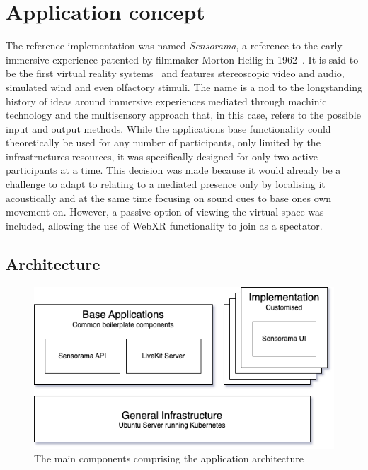 \chapter{Application concept}
\label{ch:concept}

The reference implementation was named \emph{Sensorama}, a reference to the early immersive experience patented by filmmaker Morton Heilig in 1962~\parencite{Heilig_1962}.
It is said to be the first virtual reality systems~\parencite[5][]{vrHistoryGigante} and features stereoscopic video and audio, simulated wind and even olfactory stimuli.
The name is a nod to the longstanding history of ideas around immersive experiences mediated through machinic technology and the multisensory approach that, in this case, refers to the possible input and output methods.
While the application\textquotesingle s base functionality could theoretically be used for any number of participants, only limited by the infrastructure\textquotesingle s resources, it was specifically designed for only two active participants at a time.
This decision was made because it would already be a challenge to adapt to relating to a mediated presence only by localising it acoustically and at the same time focusing on sound cues to base one\textquotesingle s own movement on.
However, a passive option of viewing the virtual space was included, allowing the use of \ac{WebXR} functionality to join as a spectator.

\section{Architecture}
\label{sec:architecture}

\begin{figure}[h]
\centering
\includegraphics[scale=0.5]{04_Artefakte/01_Abbildungen/sensorama-stack}
\caption[Sensorama stack diagram]{The main components comprising the application architecture\protect}
\label{fig:sensoramaStack}
\end{figure}

